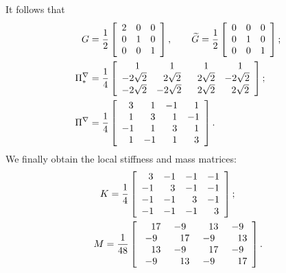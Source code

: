 \documentclass[a4paper]{article}
\begin{document}
\noindent
It follows that
\begin{align}
G = \frac{1}{2}&\left[\begin{array}{c c c}
2 & 0 & 0\\
0 & 1 & 0\\
0 & 0 & 1\\
\end{array}\right],
\qquad 
\widetilde{G} = \frac{1}{2}\left[\begin{array}{c c c}
0 & 0 & 0\\
0 & 1 & 0\\
0 & 0 & 1\\
\end{array}\right];\\
%
\Pi^\nabla_* = \frac{1}{4}&\left[\begin{array}{c c c c}
\ \ 1 & \ \ 1 & \ \ 1 & \ \ 1\\
-2\sqrt{2} & \ \ 2\sqrt{2} & \ \ 2\sqrt{2} & -2\sqrt{2}\\
-2\sqrt{2} & -2\sqrt{2} & \ \ 2\sqrt{2} & \ \ 2\sqrt{2}
\end{array}\right];\\
%
\Pi^\nabla = \frac{1}{4}&\left[\begin{array}{c c c c}
\ \ 3 & \ \ 1 & -1 & \ \ 1\\
\ \ 1 & \ \ 3 & \ \ 1 & -1\\
-1 & \ \ 1 & \ \ 3 & \ \ 1\\
\ \ 1 & -1 & \ \ 1 & \ \ 3\\
\end{array}\right].
\end{align}
We finally obtain the local stiffness and mass matrices:
\begin{align}
\label{stiffness_2d}
K = \frac{1}{4}&\left[\begin{array}{c c c c}
\ \ 3 &  -1 & -1 &  -1\\
 -1 & \ \ 3 &  -1 & -1\\
-1 &  -1 & \ \ 3 & -1\\
 -1 & -1 & - 1 & \ \ 3\\
\end{array}\right];\\
%
\label{mass_2d}
M = \frac{1}{48}&\left[\begin{array}{c c c c}
 \ \ \ 17 & -9 & \ \ \ 13 &  -9\\
 -9 &  \ \ \ 17 &  -9 & \ \ \ 13\\
\ \ \ 13 &  -9 &  \ \ \ 17 & -9\\
 -9 & \ \ \ 13 & - 9 & \ \ \ 17\\
\end{array}\right].
\end{align}
\end{document}
